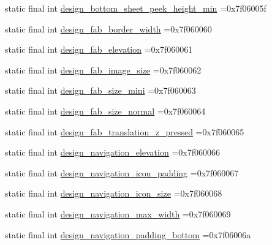 \begin{DoxyCompactItemize}
\item 
static final int \mbox{\hyperlink{classbr_1_1unb_1_1cic_1_1mp_1_1marketmaster_1_1R_1_1dimen_abad595fa74d801c937860e54c7543a9c}{design\+\_\+bottom\+\_\+sheet\+\_\+peek\+\_\+height\+\_\+min}} =0x7f06005f
\item 
static final int \mbox{\hyperlink{classbr_1_1unb_1_1cic_1_1mp_1_1marketmaster_1_1R_1_1dimen_a15c8c0b450a568bdf3d1ec959bf061e6}{design\+\_\+fab\+\_\+border\+\_\+width}} =0x7f060060
\item 
static final int \mbox{\hyperlink{classbr_1_1unb_1_1cic_1_1mp_1_1marketmaster_1_1R_1_1dimen_a44c2df08653642a136d959c89982b42c}{design\+\_\+fab\+\_\+elevation}} =0x7f060061
\item 
static final int \mbox{\hyperlink{classbr_1_1unb_1_1cic_1_1mp_1_1marketmaster_1_1R_1_1dimen_a21912dfe1caa75b06c2a54407d2bdbaa}{design\+\_\+fab\+\_\+image\+\_\+size}} =0x7f060062
\item 
static final int \mbox{\hyperlink{classbr_1_1unb_1_1cic_1_1mp_1_1marketmaster_1_1R_1_1dimen_a9f974af2874a662c5b3d958a49de6b8f}{design\+\_\+fab\+\_\+size\+\_\+mini}} =0x7f060063
\item 
static final int \mbox{\hyperlink{classbr_1_1unb_1_1cic_1_1mp_1_1marketmaster_1_1R_1_1dimen_af670ea0c4f3a80537460e86fe83c617a}{design\+\_\+fab\+\_\+size\+\_\+normal}} =0x7f060064
\item 
static final int \mbox{\hyperlink{classbr_1_1unb_1_1cic_1_1mp_1_1marketmaster_1_1R_1_1dimen_a178efc36ba088875c5717a82b114bb84}{design\+\_\+fab\+\_\+translation\+\_\+z\+\_\+pressed}} =0x7f060065
\item 
static final int \mbox{\hyperlink{classbr_1_1unb_1_1cic_1_1mp_1_1marketmaster_1_1R_1_1dimen_a529f02ba8d14cb6ed07f59b3b30cef0b}{design\+\_\+navigation\+\_\+elevation}} =0x7f060066
\item 
static final int \mbox{\hyperlink{classbr_1_1unb_1_1cic_1_1mp_1_1marketmaster_1_1R_1_1dimen_a57f6f7c5bf1f9e8d48f6527bbc4740b9}{design\+\_\+navigation\+\_\+icon\+\_\+padding}} =0x7f060067
\item 
static final int \mbox{\hyperlink{classbr_1_1unb_1_1cic_1_1mp_1_1marketmaster_1_1R_1_1dimen_ab552a057a08dddfe7dea8375b3bbaed8}{design\+\_\+navigation\+\_\+icon\+\_\+size}} =0x7f060068
\item 
static final int \mbox{\hyperlink{classbr_1_1unb_1_1cic_1_1mp_1_1marketmaster_1_1R_1_1dimen_ac1e621751315ca453c714641f615af63}{design\+\_\+navigation\+\_\+max\+\_\+width}} =0x7f060069
\item 
static final int \mbox{\hyperlink{classbr_1_1unb_1_1cic_1_1mp_1_1marketmaster_1_1R_1_1dimen_aa68417932d3b9c8fd87ada9c7da185f0}{design\+\_\+navigation\+\_\+padding\+\_\+bottom}} =0x7f06006a

\end{DoxyCompactItemize}
